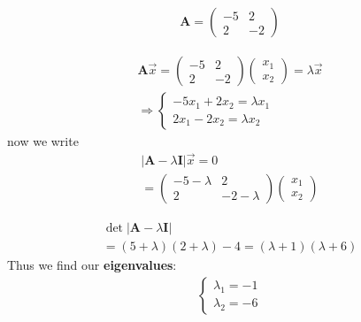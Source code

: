 \begin{myExample}
	\begin{eqnarray*}
		\mathbf{A}=
		\begin{pmatrix}
			-5 & 2\\
			2 & -2
		\end{pmatrix}
	\end{eqnarray*}
	
	\begin{eqnarray*}
			\mathbf{A}\overrightarrow x=
			\begin{pmatrix}
				-5 & 2\\
				2 & -2
			\end{pmatrix}
			\begin{pmatrix}
				x_1\\x_2
			\end{pmatrix}
			=\lambda\overrightarrow x
			\\\Rightarrow
			\begin{cases}
				-5x_1+2x_2=\lambda x_1\\
				2x_1-2x_2=\lambda x_2
			\end{cases}
	\end{eqnarray*}
	now we write
	\begin{eqnarray*}
		|\mathbf{A}-\lambda \mathbf{I}|\overrightarrow x=0
		\\
		=
		\begin{pmatrix}
			-5-\lambda&2\\
			2&-2-\lambda
		\end{pmatrix}
		\begin{pmatrix}
			x_1\\x_2
		\end{pmatrix}
	\end{eqnarray*}
	
	\begin{eqnarray*}
		\det |\mathbf{A}-\lambda \mathbf{I}|\\
		=(5+\lambda)(2+\lambda)-4=(\lambda+1)(\lambda+6)
	\end{eqnarray*}
	Thus we find our \textbf{eigenvalues}:
	\begin{eqnarray*}
		\begin{cases}
			\lambda_1=-1\\
			\lambda_2=-6
		\end{cases}
	\end{eqnarray*}


\end{myExample}
